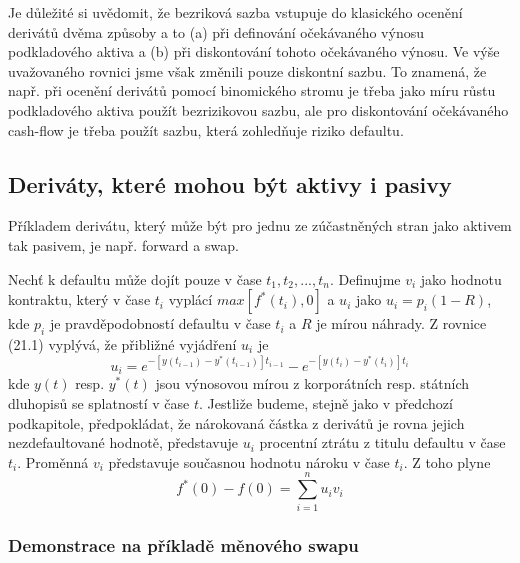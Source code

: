 \documentclass[a4paper]{book}
\begin{document}
Je důležité si uvědomit, že bezriková sazba vstupuje do klasického ocenění derivátů dvěma způsoby a to (a) při definování očekávaného výnosu podkladového aktiva a (b) při diskontování tohoto očekávaného výnosu. Ve výše uvažovaného rovnici jsme však změnili pouze diskontní sazbu. To znamená, že např. při ocenění derivátů pomocí binomického stromu je třeba jako míru růstu podkladového aktiva použít bezrizikovou sazbu, ale pro diskontování očekávaného cash-flow je třeba použít sazbu, která zohledňuje riziko defaultu.

\subsection{Deriváty, které mohou být aktivy i pasivy}
Příkladem derivátu, který může být pro jednu ze zúčastněných stran jako aktivem tak pasivem, je např. forward a swap.

Nechť k defaultu může dojít pouze v čase $t_1, t_2, ..., t_n$. Definujme $v_i$ jako hodnotu kontraktu, který v čase $t_i$ vyplácí $max[f^*(t_i),0]$ a $u_i$ jako $u_i = p_i(1-R)$, kde $p_i$ je pravděpodobností defaultu v čase $t_i$ a $R$ je mírou náhrady. Z rovnice (21.1) vyplývá, že přibližné vyjádření $u_i$ je
\begin{equation}
u_i = e^{-[y(t_{i-1})-y^*(t_{i-1})]t_{i-1}}-e^{-[y(t_i)-y^*(t_i)]t_i}
\end{equation}
kde $y(t)$ resp. $y^*(t)$ jsou výnosovou mírou z korporátních resp. státních dluhopisů se splatností v čase $t$. Jestliže budeme, stejně jako v předchozí podkapitole, předpokládat, že nárokovaná částka z derivátů je rovna jejich nezdefaultované hodnotě, představuje $u_i$ procentní ztrátu z titulu defaultu v čase $t_i$. Proměnná $v_i$ představuje současnou hodnotu nároku v čase $t_i$. Z toho plyne
\begin{equation*}
f^*(0)-f(0)=\sum^n_{i=1}u_i v_i
\end{equation*}

\subsubsection{Demonstrace na příkladě měnového swapu}
\end{document}
